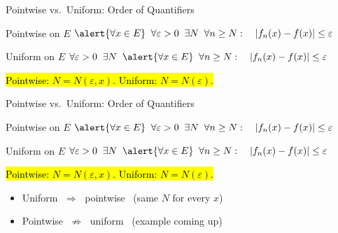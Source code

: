 \documentclass[aspectratio=169,12pt,t]{beamer}
\begin{document}
{%
\begin{frame}{Pointwise vs.\ Uniform: Order of Quantifiers}
  \begin{remblock}{Pointwise on $E$}
    $\alert{\forall x \in E}\;\; \forall \varepsilon > 0\;\; \exists N\;\;
      \forall n \geq N: \quad |f_n(x) - f(x)| \leq \varepsilon$
  \end{remblock}
  \begin{defblock}{Uniform on $E$}
    $\forall \varepsilon > 0\;\; \exists N\;\; \alert{\forall x \in E}\;\;
      \forall n \geq N: \quad |f_n(x) - f(x)| \leq \varepsilon$
  \end{defblock}

  \vspace{0.3em}
  \hl{Pointwise: $N = N(\varepsilon, x)$. \qquad Uniform: $N = N(\varepsilon)$.}

\end{frame}

\begin{frame}{Pointwise vs.\ Uniform: Order of Quantifiers}
  \begin{remblock}{Pointwise on $E$}
    $\alert{\forall x \in E}\;\; \forall \varepsilon > 0\;\; \exists N\;\;
      \forall n \geq N: \quad |f_n(x) - f(x)| \leq \varepsilon$
  \end{remblock}
  \begin{defblock}{Uniform on $E$}
    $\forall \varepsilon > 0\;\; \exists N\;\; \alert{\forall x \in E}\;\;
      \forall n \geq N: \quad |f_n(x) - f(x)| \leq \varepsilon$
  \end{defblock}

  \vspace{0.3em}
  \hl{Pointwise: $N = N(\varepsilon, x)$. \qquad Uniform: $N = N(\varepsilon)$.}

  \vspace{0.3em}
  \begin{hlbox}
  \begin{itemize}
    \item Uniform $\;\Longrightarrow\;$ pointwise \ (same $N$ for every $x$)
    \item Pointwise $\;\not\Longrightarrow\;$ uniform \ (example coming up)
  \end{itemize}
  \end{hlbox}


\end{frame}}
\end{document}

